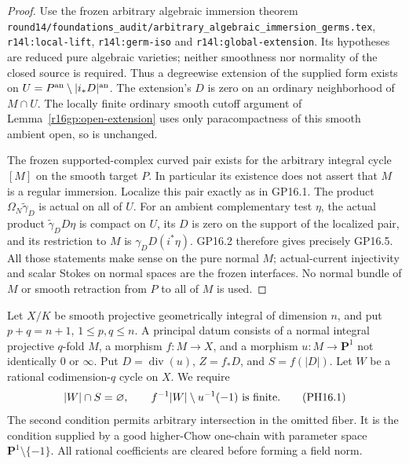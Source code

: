 \begin{proof}
Use the frozen arbitrary algebraic immersion theorem
\texttt{round14/foundations\_audit/arbitrary\_algebraic\_immersion\_germs.tex},
\texttt{r14l:local-lift}, \texttt{r14l:germ-iso} and
\texttt{r14l:global-extension}.  Its hypotheses are reduced pure
algebraic varieties; neither smoothness nor normality of the closed
source is required.  Thus a degreewise extension of the supplied form
exists on $U=P^{\rm an}\setminus|i_*D|^{\rm an}$.  The extension's
$D$ is zero on an ordinary neighborhood of $M\cap U$.  The locally
finite ordinary smooth cutoff argument of
Lemma~\ref{r16gp:open-extension} uses only paracompactness of this
smooth ambient open, so is unchanged.

The frozen supported-complex curved pair exists for the arbitrary
integral cycle $[M]$ on the smooth target $P$.  In particular its
existence does not assert that $M$ is a regular immersion.  Localize
this pair exactly as in GP16.1.  The product
$\Omega_N\widetilde\gamma_D$ is actual on all of $U$.
For an ambient complementary test $\eta$, the actual product
$\widetilde\gamma_D D\eta$ is compact on $U$, its $D$ is zero
on the support of the localized pair, and its restriction to $M$
is $\gamma_D D(i^*\eta)$.  GP16.2 therefore gives precisely
GP16.5.  All those statements make sense on the pure normal $M$;
actual-current injectivity and scalar Stokes on normal spaces are
the frozen interfaces.  No normal bundle of $M$ or smooth retraction
from $P$ to all of $M$ is used.
\end{proof}

\begin{definition}
\label{r16ph:datum}
Let $X/K$ be smooth projective geometrically integral of dimension
$n$, and put $p+q=n+1$, $1\le p,q\le n$.
A principal datum consists of a normal integral projective
$q$-fold $M$, a morphism $f:M\to X$, and a morphism
$u:M\to\mathbf P^1$ not identically $0$ or $\infty$.
Put $D=\operatorname{div}(u)$, $Z=f_*D$, and $S=f(|D|)$.
Let $W$ be a rational codimension-$q$ cycle on $X$.  We require
\[
 |W|\cap S=\varnothing,\qquad
 f^{-1}|W|\setminus u^{-1}(-1)\ \hbox{is finite}.
 \tag{PH16.1}\label{r16ph:position}
\]
The second condition permits arbitrary intersection in the omitted
fiber.  It is the condition supplied by a good higher-Chow
one-chain with parameter space $\mathbf P^1\setminus\{-1\}$.
All rational coefficients are cleared before forming a field norm.
\end{definition}

